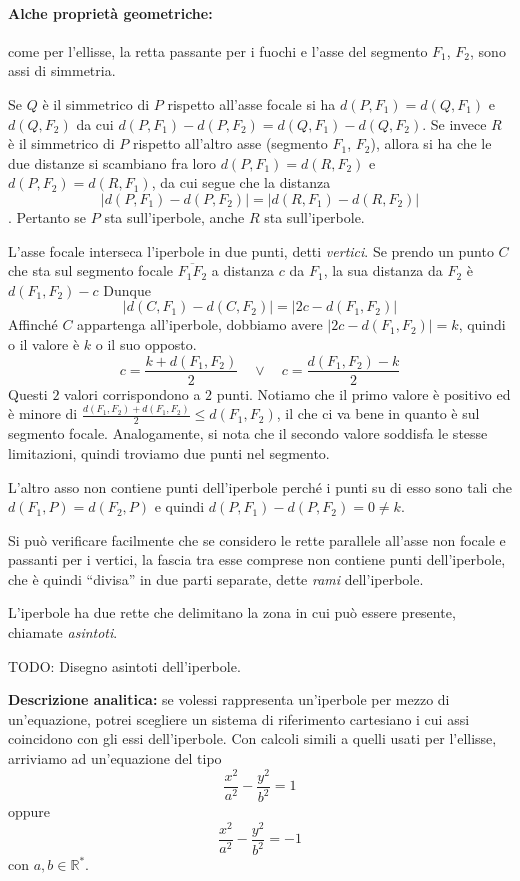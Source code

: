 \documentclass[a4paper]{article}
\begin{document}
\paragraph{Alche proprietà geometriche:}
come per l'ellisse, la retta passante per i fuochi e l'asse del segmento \(F_1\), \(F_2\),
sono assi di simmetria.

Se \(Q\) è il simmetrico di \(P\) rispetto all'asse focale si ha
\(d(P, F_1) = d(Q, F_1)\) e \(d(Q, F_2)\) da cui \(d(P, F_1) - d(P, F_2) = d(Q, F_1) - d(Q, F_2)\).
Se invece \(R\) è il simmetrico di \(P\) rispetto all'altro asse (segmento \(F_1\), \(F_2\)),
allora si ha che le due distanze si scambiano fra loro \(d(P, F_1) = d(R, F_2)\) e \(d(P, F_2) = d(R, F_1)\),
da cui segue che la distanza \[|d(P, F_1)-d(P, F_2)| = |d(R, F_1)-d(R, F_2)|\].
Pertanto se \(P\) sta sull'iperbole, anche \(R\) sta sull'iperbole.

L'asse focale interseca l'iperbole in due punti, detti \textit{vertici}.
Se prendo un punto \(C\) che sta sul segmento focale \(\overline{F_1F_2}\) a distanza
\(c\) da \(F_1\), la sua distanza da \(F_2\) è \(d(F_1, F_2) - c\)
Dunque
\[
    |d(C, F_1) - d(C, F_2)| = |2c - d(F_1, F_2)|
\]
Affinché \(C\) appartenga all'iperbole, dobbiamo avere \(|2c - d(F_1, F_2)| = k\),
quindi o il valore è \(k\) o il suo opposto.
\[
    c=\frac{k + d(F_1, F_2)}{2} \quad \lor \quad c = \frac{d(F_1, F_2)-k}{2}
\]
Questi \(2\) valori corrispondono a \(2\) punti. Notiamo che il primo valore
è positivo ed è minore di \(\frac{d(F_1, F_2) + d(F_1, F_2)}{2} \leq d(F_1, F_2)\),
il che ci va bene in quanto è sul segmento focale. Analogamente, si nota che il secondo
valore soddisfa le stesse limitazioni, quindi troviamo due punti nel segmento.

L'altro asso non contiene punti dell'iperbole perché i punti su di esso sono tali che
\(d(F_1, P) = d(F_2, P)\) e quindi \(d(P, F_1) - d(P, F_2) = 0 \neq k\).

Si può verificare facilmente che se considero le rette parallele all'asse non focale
e passanti per i vertici, la fascia tra esse comprese non contiene punti dell'iperbole,
che è quindi ``divisa'' in due parti separate, dette \textit{rami} dell'iperbole.

L'iperbole ha due rette che delimitano la zona in cui può essere presente, chiamate \textit{asintoti}.

TODO: Disegno asintoti dell'iperbole.

\textbf{Descrizione analitica:} se volessi rappresenta un'iperbole per mezzo di un'equazione,
potrei scegliere un sistema di riferimento cartesiano i cui assi coincidono con gli essi dell'iperbole.
Con calcoli simili a quelli usati per l'ellisse, arriviamo
ad un'equazione del tipo
\[
    \frac{x^2}{a^2} - \frac{y^2}{b^2} = 1
\]
oppure 
\[
    \frac{x^2}{a^2} - \frac{y^2}{b^2} = -1
\]
con \(a,b \in \mathbb{R}^*\).
\end{document}
